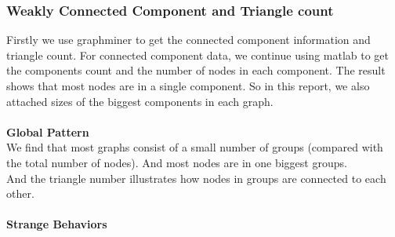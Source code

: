 
\subsubsection{Weakly Connected Component and Triangle count}
Firstly we use graphminer to get the connected component information and triangle count. For connected component data, we continue using matlab to get the components count and the number of nodes in each component. The result shows that most nodes are in a single component. So in this report, we also attached sizes of the biggest components in each graph. \\ 
\\
\textbf{Global Pattern} \\
We find that most graphs consist of a small number of groups (compared with the total number of nodes). And most nodes are in one biggest groups. \\
And the triangle number illustrates how nodes in groups are connected to each other. \\
\\
\textbf{Strange Behaviors} \\
